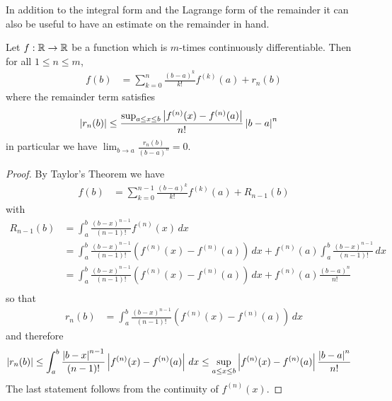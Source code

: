 In addition to the integral form and the Lagrange form of the
remainder it can also be useful to have an estimate on the remainder
in hand.
\begin{cor}\label{TaylorsTheoremRemainderEstimate}Let $f: \mathbb{R}\to
  \mathbb{R}$ be a function which is $m$-times continuously differentiable.  Then for all
  $1 \leq n \leq m$,
\begin{align*}
f(b) &= \sum_{k=0}^n \frac{(b-a)^k}{k!} f^{(k)}(a) + r_n(b)
\end{align*}
where the remainder term satisfies
\begin{align*}
\left \vert r_n(b) \right \vert &\leq 
\frac{\sup_{a \leq x \leq b}\left \vert f^{(n)}(x) - f^{(n)}(a) \right \vert}{n!} \left \vert b-a \right \vert^n
\end{align*}
in particular we have $\lim_{b \to a} \frac{r_n(b)}{(b-a)^n} = 0$.
\end{cor}
\begin{proof}
By Taylor's Theorem we have
\begin{align*}
f(b) &= \sum_{k=0}^{n-1} \frac{(b-a)^k}{k!} f^{(k)}(a) + R_{n-1}(b)
\end{align*}
with
\begin{align*}
R_{n-1}(b) &= \int_a^b \frac{(b-x)^{n-1}}{(n-1)!} f^{(n)}(x) \, dx \\
&=\int_a^b \frac{(b-x)^{n-1}}{(n-1)!} (f^{(n)}(x) - f^{(n)}(a)) \, dx +
 f^{(n)}(a) \int_a^b \frac{(b-x)^{n-1}}{(n-1)!} \, dx \\
&=\int_a^b \frac{(b-x)^{n-1}}{(n-1)!} (f^{(n)}(x) - f^{(n)}(a)) \, dx +
 f^{(n)}(a) \frac{(b-a)^{n}}{n!}  \\
\end{align*}
so that 
\begin{align*}
r_n(b) &= \int_a^b \frac{(b-x)^{n-1}}{(n-1)!} (f^{(n)}(x) - f^{(n)}(a)) \, dx
\end{align*}
and therefore
\begin{align*}
\left \vert r_n(b) \right \vert &\leq \int_a^b \frac{\left \vert b-x \right \vert^{n-1}}{(n-1)!} \left \vert f^{(n)}(x) -
               f^{(n)}(a) \right \vert \, dx
\leq \sup_{a \leq x \leq b} \left \vert f^{(n)}(x) - f^{(n)}(a) \right \vert \frac{\left \vert b-a \right \vert^{n}}{n!} 
\end{align*}
The last statement follows from the continuity of $f^{(n)}(x)$.
\end{proof}

